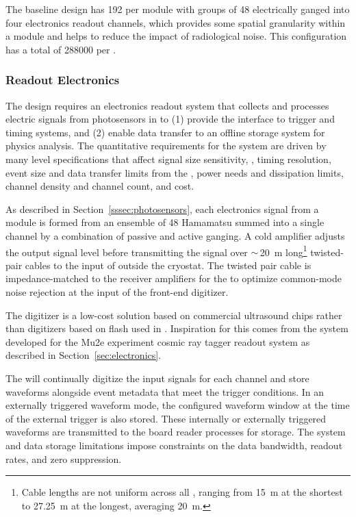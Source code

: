 The baseline  design has \num{192} %
 per  module with groups of \num{48}  electrically ganged into four electronics readout channels, which provides some spatial granularity within a module and helps to reduce the impact of radiological noise. This configuration has a total of \num{288000}  per . 


\subsubsection{Readout Electronics} 

The  design requires an electronics readout system that collects and processes electric signals from photosensors in \lar to (1) provide the interface to trigger and timing systems,
and (2) enable data transfer to an offline storage system for physics analysis. The quantitative requirements for the system are driven by many  level specifications that affect signal size sensitivity, , timing resolution, event size and data transfer limits from the , power needs and dissipation limits, channel density and channel count, and cost. 

As described in Section~\ref{sssec:photosensors}, each electronics signal from a  module is formed from an ensemble of 48 Hamamatsu  summed into a single channel by a combination of passive and active ganging.  A cold amplifier adjusts the  output signal level before transmitting the signal over $\sim\,$\SI{20}{m} long\footnote{Cable lengths are not uniform across all , ranging from \SI{15}{m} at the shortest to \SI{27.25}{m} at the longest, averaging \SI{20}{m}.} twisted-pair cables to the input of   outside the cryostat.  The twisted pair cable is impedance-matched to  the receiver amplifiers for the  to optimize common-mode noise rejection at the input of the front-end digitizer. 

The digitizer is a low-cost solution based on commercial ultrasound  chips rather than digitizers based on flash  used in . Inspiration for this  comes from the system developed for the Mu2e experiment cosmic ray tagger readout system as described in Section~\ref{sec:electronics}.

The  will continually digitize the input signals for each channel and store waveforms alongside event metadata that meet the trigger conditions. In an externally triggered waveform mode, the configured waveform window at the time of the external trigger is also stored. These internally or externally triggered waveforms are transmitted to the  board reader processes for storage. The  system and data storage limitations impose constraints on the data bandwidth, readout rates, and zero suppression. 

